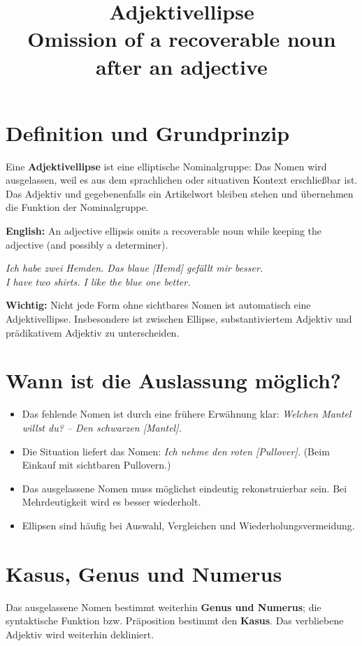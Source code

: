 \documentclass[a4paper,11pt]{article}
\title{Adjektivellipse\\\large Omission of a recoverable noun after an adjective}
\date{}
\begin{document}
\maketitle
\tableofcontents

\section{Definition und Grundprinzip}
Eine \textbf{Adjektivellipse} ist eine elliptische Nominalgruppe: Das Nomen wird ausgelassen, weil es aus dem sprachlichen oder situativen Kontext erschließbar ist. Das Adjektiv und gegebenenfalls ein Artikelwort bleiben stehen und übernehmen die Funktion der Nominalgruppe.

\textbf{English:} An adjective ellipsis omits a recoverable noun while keeping the adjective (and possibly a determiner).

\textit{Ich habe zwei Hemden. Das blaue [Hemd] gefällt mir besser.}\\
\textit{I have two shirts. I like the blue one better.}

\textbf{Wichtig:} Nicht jede Form ohne sichtbares Nomen ist automatisch eine Adjektivellipse. Insbesondere ist zwischen Ellipse, substantiviertem Adjektiv und prädikativem Adjektiv zu unterscheiden.

\section{Wann ist die Auslassung möglich?}
\begin{itemize}
\item Das fehlende Nomen ist durch eine frühere Erwähnung klar: \textit{Welchen Mantel willst du? -- Den schwarzen [Mantel].}
\item Die Situation liefert das Nomen: \textit{Ich nehme den roten [Pullover].} (Beim Einkauf mit sichtbaren Pullovern.)
\item Das ausgelassene Nomen muss möglichst eindeutig rekonstruierbar sein. Bei Mehrdeutigkeit wird es besser wiederholt.
\item Ellipsen sind häufig bei Auswahl, Vergleichen und Wiederholungsvermeidung.
\end{itemize}

\section{Kasus, Genus und Numerus}
Das ausgelassene Nomen bestimmt weiterhin \textbf{Genus und Numerus}; die syntaktische Funktion bzw. Präposition bestimmt den \textbf{Kasus}. Das verbliebene Adjektiv wird weiterhin dekliniert.
\end{document}
